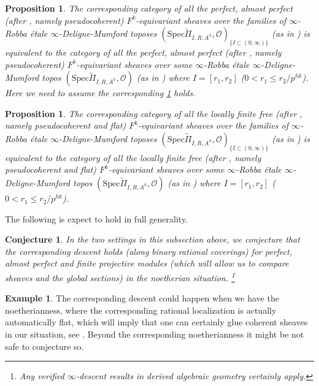 \documentclass[12pt]{amsart}
\newtheorem{proposition}[theorem]{Proposition}
\newtheorem{conjecture}[theorem]{Conjecture}
\theoremstyle{definition}
\numberwithin{equation}{section}
\newtheorem{example}[theorem]{Example}
\begin{document}
\begin{proposition}
The corresponding category of all the perfect, almost perfect (after \cite[Section 7.2.4]{Lu1}, namely pseudocoherent) $F^k$-equivariant sheaves over the families of $\infty$-Robba \'etale $\infty$-Deligne-Mumford toposes $(\mathrm{Spec}\widetilde{\Pi}_{I,R,A^h},\mathcal{O})_{\{I \subset (0,\infty)\}}$ (as in \cite[Chapter 1.4]{Lu2}) is equivalent to the category of all the perfect, almost perfect (after \cite[Section 7.2.4]{Lu1}, namely pseudocoherent) $F^k$-equivariant sheaves over some $\infty$-Robba \'etale $\infty$-Deligne-Mumford topos $(\mathrm{Spec}\widetilde{\Pi}_{I,R,A^h},\mathcal{O})$ (as in \cite[Chapter 1.4]{Lu2}) where $I=[r_1,r_2]$ ($0<r_1\leq r_2/p^{hk}$). Here we need to assume the corresponding \cref{conjecture6.22} holds.	
\end{proposition}


\begin{proposition}
The corresponding category of all the locally finite free (after \cite[Section 7.2.2, 7.2.4]{Lu1}, namely pseudocoherent and flat) $F^k$-equivariant sheaves over the families of $\infty$-Robba \'etale $\infty$-Deligne-Mumford toposes $(\mathrm{Spec}\widetilde{\Pi}_{I,R,A^h},\mathcal{O})_{\{I \subset (0,\infty)\}}$ (as in \cite[Chapter 1.4]{Lu2}) is equivalent to the category of all the locally finite free (after \cite[Section 7.2.2, 7.2.4]{Lu1}, namely pseudocoherent and flat) $F^k$-equivariant sheaves over some $\infty$-Robba \'etale $\infty$-Deligne-Mumford topos $(\mathrm{Spec}\widetilde{\Pi}_{I,R,A^h},\mathcal{O})$ (as in \cite[Chapter 1.4]{Lu2}) where $I=[r_1,r_2]$ ($0<r_1\leq r_2/p^{hk}$).	
\end{proposition}





\indent The following is expect to hold in full generality.

\begin{conjecture} \label{conjecture6.22}
In the two settings in this subsection above, we conjecture that the corresponding descent holds (along binary rational coverings) for perfect, almost perfect and finite projective modules (which will allow us to compare sheaves and the global sections) in the noetherian situation. \footnote{Any verified $\infty$-descent results in derived algebraic geometry certainly apply.}	
\end{conjecture}



\begin{example}
The corresponding descent could happen when we have the noetherianness, where the corresponding rational localization is actually automatically flat, which will imply that one can certainly glue coherent sheaves in our situation, see \cite[Theorem 1.3.9]{KL1}. Beyond the corresponding noetherianness it might be not safe to conjecture so. 
\end{example}
 	
\end{document}
